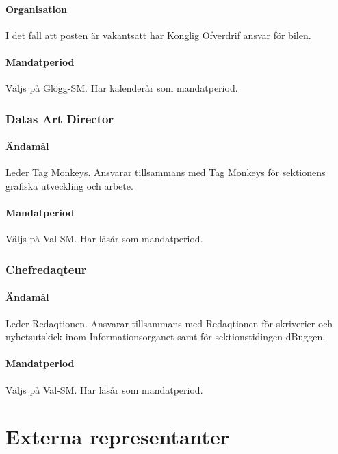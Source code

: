 \documentclass{dgovdoc}
\begin{document}
\paragraph{Organisation}

I det fall att posten är vakantsatt har Konglig Öfverdrif ansvar för bilen.

\paragraph{Mandatperiod}

Väljs på Glögg-SM. Har kalenderår som mandatperiod.

\subsubsection{Datas Art Director}

\paragraph{Ändamål}
Leder Tag Monkeys. Ansvarar tillsammans med Tag Monkeys för sektionens
grafiska utveckling och arbete.

\paragraph{Mandatperiod}

Väljs på Val-SM. Har läsår som mandatperiod.

\subsubsection{Chefredaqteur}

\paragraph{Ändamål}
Leder Redaqtionen. Ansvarar tillsammans med Redaqtionen för skriverier och
nyhetsutskick inom Informationsorganet samt för sektionstidingen dBuggen.

\paragraph{Mandatperiod}
Väljs på Val-SM. Har läsår som mandatperiod.

\section{Externa representanter}
\end{document}
